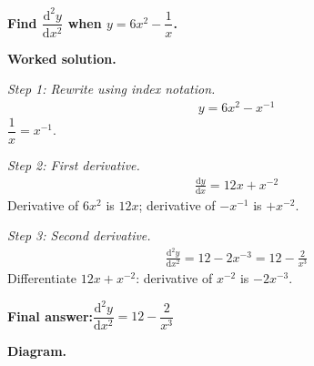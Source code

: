 \documentclass[11pt]{article}
\newcommand{\question}[1]{\par\medskip\noindent\textbf{#1}\par}
\begin{document}
\question{Find \( \dfrac{\mathrm{d}^2y}{\mathrm{d}x^2} \) when \( y = 6x^2 - \dfrac{1}{x} \).}

\textbf{Worked solution.}

\textit{Step 1: Rewrite using index notation.}
\[\begin{gathered}
y = 6x^2 - x^{-1}
\end{gathered}\]
\( \dfrac{1}{x} = x^{-1} \).

\textit{Step 2: First derivative.}
\[\begin{gathered}
\frac{\mathrm{d}y}{\mathrm{d}x} = 12x + x^{-2}
\end{gathered}\]
Derivative of \(6x^2\) is \(12x\); derivative of \(-x^{-1}\) is \(+x^{-2}\).

\textit{Step 3: Second derivative.}
\[\begin{gathered}
\frac{\mathrm{d}^2y}{\mathrm{d}x^2} = 12 - 2x^{-3} = 12 - \frac{2}{x^3}
\end{gathered}\]
Differentiate \(12x + x^{-2}\): derivative of \(x^{-2}\) is \(-2x^{-3}\).

\begin{answerbox}
\textbf{Final answer:}\quad \(\displaystyle  \dfrac{\mathrm{d}^2y}{\mathrm{d}x^2} = 12 - \dfrac{2}{x^3} \)
\end{answerbox}
\textbf{Diagram.}
\end{document}
